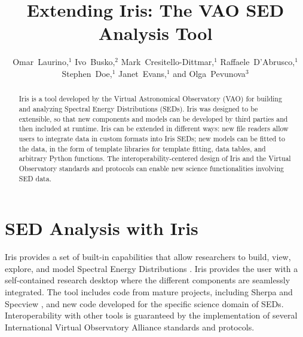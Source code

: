 
\resetcounters




\title{Extending Iris: The VAO SED Analysis Tool}
\author{Omar~Laurino,$^{1}$ Ivo~Busko,$^2$ Mark~Cresitello-Dittmar,$^1$ Raffaele~D'Abrusco,$^1$ Stephen~Doe,$^1$ Janet~Evans,$^1$ and Olga~Pevunova$^3$
}


\begin{abstract}
Iris is a tool developed by the Virtual Astronomical Observatory (VAO) for building and analyzing Spectral Energy Distributions (SEDs). Iris was designed to be extensible, so that new components and models can be developed by third parties and then included at runtime. Iris can be extended in different ways: new file readers allow users to integrate data in custom formats into Iris SEDs; new models can be fitted to the data, in the form of template libraries for template fitting, data tables, and arbitrary Python functions. The interoperability-centered design of Iris and the Virtual Observatory standards and protocols can enable new science functionalities involving SED data.
\end{abstract}

\section{SED Analysis with Iris}
Iris provides a set of built-in capabilities that allow researchers to build, view, explore, and model Spectral Energy Distributions \citep[SEDs;][]{2012ASPC..461..893D}. Iris provides the user with a self-contained research desktop where the different components are seamlessly integrated. The tool includes code from mature projects, including Sherpa \citep{2007ASPC..376..543D} and Specview \citep{2000ASPC..216...79B}, and new code developed for the specific science domain of SEDs. Interoperability with other tools is guaranteed by the implementation of several International Virtual Observatory Alliance standards and protocols.

